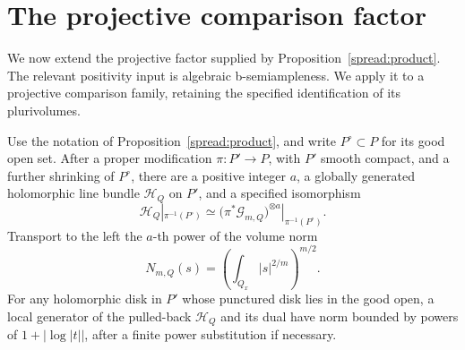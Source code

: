 \section{The projective comparison factor}
\label{compare:section}

We now extend the projective factor supplied by
Proposition~\ref{spread:product}.  The relevant positivity input is
algebraic b-semiampleness.  We apply it to a projective comparison
family, retaining the specified identification of its plurivolumes.

\begin{proposition}
\label{compare:semiample}
Use the notation of Proposition~\ref{spread:product}, and write
\(P^\circ\subset P\) for its good open set.  After a proper modification
\(\pi:P'\to P\), with \(P'\) smooth compact, and a further shrinking of
\(P^\circ\), there are a positive integer \(a\), a globally generated
holomorphic line bundle \(\mathcal H_Q\) on \(P'\), and a specified
isomorphism
\begin{equation}
\label{compare:open-identification}
 \mathcal H_Q|_{\pi^{-1}(P^\circ)}
 \simeq
 \bigl(\pi^*\mathcal G_{m,Q}\bigr)^{\otimes a}
       |_{\pi^{-1}(P^\circ)} .
\end{equation}
Transport to the left the \(a\)-th power of the volume norm
\[
 N_{m,Q}(s)=
 \left(\int_{Q_x}|s|^{2/m}\right)^{m/2}.
\]
For any holomorphic disk in \(P'\) whose punctured disk lies in the
good open, a local generator of the pulled-back \(\mathcal H_Q\)
and its dual have norm bounded by powers of
\(1+|\log|t||\), after a finite power substitution if necessary.
\end{proposition}

